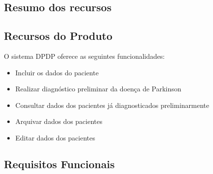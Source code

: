 \begin{anexosenv}
	\subsection{Resumo dos recursos}


	\subsection{Recursos do Produto}

	O sistema DPDP oferece as seguintes funcionalidades:

	\begin{itemize}
		\item Incluir os dados do paciente
		\item Realizar diagnóstico preliminar da doença de Parkinson
		\item Consultar dados dos pacientes já diagnosticados preliminarmente
		\item Arquivar dados dos pacientes
		\item Editar dados dos pacientes
	\end{itemize}

	\subsection{Requisitos Funcionais}


\end{anexosenv}
